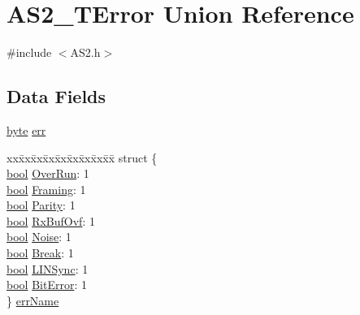 \hypertarget{union_a_s2___t_error}{}\section{A\+S2\+\_\+\+T\+Error Union Reference}
\label{union_a_s2___t_error}


{\ttfamily \#include $<$A\+S2.\+h$>$}

\subsection*{Data Fields}
\begin{DoxyCompactItemize}
\item 
\hyperlink{group___p_e___types__module_ga0c8186d9b9b7880309c27230bbb5e69d}{byte} \hyperlink{union_a_s2___t_error_a52cc22cfe0b3ac9a8f88848b02f4d47e}{err}
\item 
\begin{tabbing}
xx\=xx\=xx\=xx\=xx\=xx\=xx\=xx\=xx\=\kill
struct \{\\
\>\hyperlink{group___p_e___types__module_ga97a80ca1602ebf2303258971a2c938e2}{bool} \hyperlink{union_a_s2___t_error_ae15421a6d353dfef2478432985ea60f7}{OverRun}: 1\\
\>\hyperlink{group___p_e___types__module_ga97a80ca1602ebf2303258971a2c938e2}{bool} \hyperlink{union_a_s2___t_error_aa416d4710afa5fdf70fc011d118acf1a}{Framing}: 1\\
\>\hyperlink{group___p_e___types__module_ga97a80ca1602ebf2303258971a2c938e2}{bool} \hyperlink{union_a_s2___t_error_a99fd786f4086e50e917c12b226fc82af}{Parity}: 1\\
\>\hyperlink{group___p_e___types__module_ga97a80ca1602ebf2303258971a2c938e2}{bool} \hyperlink{union_a_s2___t_error_aed37d6601dc7121b167ee47354444421}{RxBufOvf}: 1\\
\>\hyperlink{group___p_e___types__module_ga97a80ca1602ebf2303258971a2c938e2}{bool} \hyperlink{union_a_s2___t_error_a14869f07df4b46efad374f848283ab46}{Noise}: 1\\
\>\hyperlink{group___p_e___types__module_ga97a80ca1602ebf2303258971a2c938e2}{bool} \hyperlink{union_a_s2___t_error_ad42e6a21145d660db4b685f64e3f80a5}{Break}: 1\\
\>\hyperlink{group___p_e___types__module_ga97a80ca1602ebf2303258971a2c938e2}{bool} \hyperlink{union_a_s2___t_error_a40a3a1cf9de4ec81818bf122436c44d3}{LINSync}: 1\\
\>\hyperlink{group___p_e___types__module_ga97a80ca1602ebf2303258971a2c938e2}{bool} \hyperlink{union_a_s2___t_error_aea1659529fabba7dea0bd089904f5821}{BitError}: 1\\
\} \hyperlink{union_a_s2___t_error_a1a7f84270b82efb2b65d92632cc09624}{errName}\\

\end{tabbing}\end{DoxyCompactItemize}


